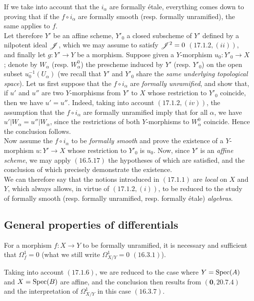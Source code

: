 If we take into account that the $i_\alpha$ are formally \'etale, everything comes down to proving that if the $f \circ i_\alpha$ are formally smooth (resp. formally unramified), the same applies to $f$.\\

Let therefore $Y'$ be an affine scheme, $Y'_0$ a closed subscheme of $Y'$ defined by a nilpotent ideal $\mathscr{J}$, which we may assume to satisfy $\mathscr{J}^2 = 0$ $(\hyperref[IV.17.1.2]{17.1.2}, (ii))$, and finally let $g : Y' \to Y$ be a morphism. Suppose given a $Y$-morphism $u_0 : Y'_0 \to X$; denote by $W_\alpha$ (resp. $W^0 _\alpha$) the prescheme induced by $Y'$ (resp. $Y'_0$) on the open subset $u_0 ^{-1}(U_\alpha)$ (we recall that $Y'$ and $Y'_0$ share the \emph{same underlying topological space}). Let us first suppose that the $f \circ i_\alpha$ are \emph{formally unramified}, and show that, if $u'$ and $u''$ are two $Y$-morphisms from $Y'$ to $X$ whose restriction to $Y'_0$ coincide, then we have $u' = u''$. Indeed, taking into account $(\hyperref[IV.17.1.2]{17.1.2}, (iv))$, the assumption that the $f \circ i_\alpha$ are formally unramified imply that for all $\alpha$, we have $u'|W_\alpha = u''|W_\alpha$, since the restrictions of both $Y$-morphisms to $W^0 _\alpha$ coincide. Hence the conclusion follows.\\

Now assume the $f \circ i_\alpha$ to be \emph{formally smooth} and prove the existence of a $Y$-morphism $u : Y' \to X$ whose restriction to $Y'_0$ is $u_0$. Now, since $Y'$ is an \emph{affine scheme}, we may apply $(\hyperref[IV.16.5.17]{16.5.17})$ the hypotheses of which are satisfied, and the conclusion of which precisely demonstrate the existence.\\

We can therefore say that the notions introduced in $(\hyperref[IV.17.1.1]{17.1.1})$ are \emph{local} on $X$ and $Y$, which always allows, in virtue of $(\hyperref[IV.17.1.2]{17.1.2}, (i))$, to be reduced to the study of formally smooth (resp. formally unramified, resp. formally \'etale) \emph{algebras}.

\subsection{General properties of differentials}
\label{subsection:IV.17.2}

\begin{proposition}[17.2.1]
\label{IV.17.2.1}
For a morphism $f : X \to Y$ to be formally unramified, it is necessary and sufficient that $\Omega^1 _f = 0$ (what we still write $\Omega^1 _{X/Y} = 0$ $(\hyperref[IV.16.3.1]{16.3.1})$).	
\end{proposition}
Taking into account $(\hyperref[IV.17.1.6]{17.1.6})$, we are reduced to the case where $Y = {\mathop{\mathrm{Spec}}\nolimits}(A)$ and $X = {\mathop{\mathrm{Spec}}\nolimits}(B)$ are affine, and the conclusion then results from $(\textbf{0}, \hyperref[0.20.7.4]{20.7.4})$ and the interpretation of $\Omega^1 _{X/Y}$ in this case $(\hyperref[IV.16.3.7]{16.3.7})$.

